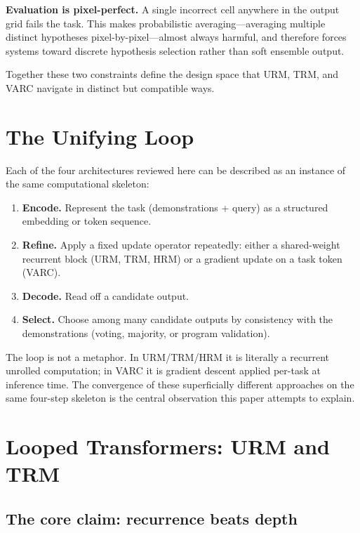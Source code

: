 \documentclass[11pt, letterpaper]{article}
\begin{document}
\textbf{Evaluation is pixel-perfect.} A single incorrect cell anywhere in the
output grid fails the task. This makes probabilistic averaging---averaging
multiple distinct hypotheses pixel-by-pixel---almost always harmful, and
therefore forces systems toward discrete hypothesis selection rather than
soft ensemble output.

Together these two constraints define the design space that URM, TRM, and
VARC navigate in distinct but compatible ways.

\section{The Unifying Loop}
\label{sec:loop}

Each of the four architectures reviewed here can be described as an instance
of the same computational skeleton:

\begin{enumerate}
  \item \textbf{Encode.} Represent the task (demonstrations + query) as a
        structured embedding or token sequence.
  \item \textbf{Refine.} Apply a fixed update operator repeatedly: either a
        shared-weight recurrent block (URM, TRM, HRM) or a gradient update
        on a task token (VARC).
  \item \textbf{Decode.} Read off a candidate output.
  \item \textbf{Select.} Choose among many candidate outputs by consistency
        with the demonstrations (voting, majority, or program validation).
\end{enumerate}

The loop is not a metaphor. In URM/TRM/HRM it is literally a recurrent unrolled
computation; in VARC it is gradient descent applied per-task at inference time.
The convergence of these superficially different approaches on the same four-step
skeleton is the central observation this paper attempts to explain.

\section{Looped Transformers: URM and TRM}
\label{sec:looped}

\subsection{The core claim: recurrence beats depth}
\end{document}
